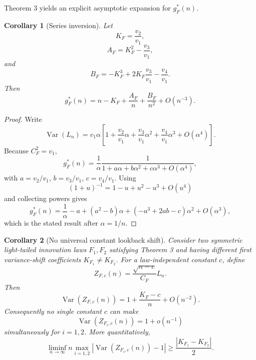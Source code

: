 \documentclass[11pt]{article}
\newtheorem{corollary}{Corollary}
\newcommand{\Var}{\operatorname{Var}}
\begin{document}
Theorem 3 yields an explicit asymptotic expansion for $g_F^*(n)$.

\begin{corollary}[Series inversion]
Let
\begin{equation}
K_F=\frac{v_2}{v_1},
\end{equation}
\begin{equation}
A_F=K_F^2-\frac{v_3}{v_1},
\end{equation}
and
\begin{equation}
B_F=-K_F^3+2K_F\frac{v_3}{v_1}-\frac{v_4}{v_1}.
\end{equation}
Then
\begin{equation}
\boxed{
g_F^*(n)=n-K_F+\frac{A_F}{n}+\frac{B_F}{n^2}+O(n^{-3}).}
\end{equation}
\end{corollary}

\begin{proof}
Write
\begin{equation}
\Var(L_n)=v_1\alpha\left[1+\frac{v_2}{v_1}\alpha+\frac{v_3}{v_1}\alpha^2+\frac{v_4}{v_1}\alpha^3+O(\alpha^4)\right].
\end{equation}
Because $C_F^2=v_1$,
\begin{equation}
g_F^*(n)=\frac1\alpha\frac1{1+a\alpha+b\alpha^2+c\alpha^3+O(\alpha^4)},
\end{equation}
with $a=v_2/v_1$, $b=v_3/v_1$, $c=v_4/v_1$. Using
\begin{equation}
(1+u)^{-1}=1-u+u^2-u^3+O(u^4)
\end{equation}
and collecting powers gives
\begin{equation}
g_F^*(n)=\frac1\alpha-a+(a^2-b)\alpha+(-a^3+2ab-c)\alpha^2+O(\alpha^3),
\end{equation}
which is the stated result after $\alpha=1/n$.
\end{proof}

\begin{corollary}[No universal constant lookback shift]
Consider two symmetric light-tailed innovation laws $F_1,F_2$ satisfying Theorem 3 and having different first variance-shift coefficients $K_{F_1}\ne K_{F_2}$. For a law-independent constant $c$, define
\begin{equation}
Z_{F,c}(n)=\frac{\sqrt{n-c}}{C_F}L_n.
\end{equation}
Then
\begin{equation}
\Var(Z_{F,c}(n))
=1+\frac{K_F-c}{n}+O(n^{-2}).
\end{equation}
Consequently no single constant $c$ can make
\begin{equation}
\Var(Z_{F_i,c}(n))=1+o(n^{-1})
\end{equation}
simultaneously for $i=1,2$. More quantitatively,
\begin{equation}
\liminf_{n\to\infty} n\max_{i=1,2}
\left|\Var(Z_{F_i,c}(n))-1\right|
\ge \frac{|K_{F_1}-K_{F_2}|}{2}.
\end{equation}
\end{corollary}
\end{document}
